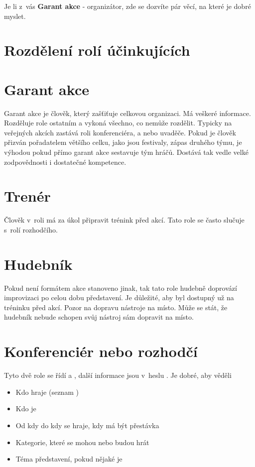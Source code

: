 \needspace{5cm} \label{příprava zápasu} Je li z~vás \textbf{Garant akce} - organizátor, zde se dozvíte pár věcí, na které je dobré myslet. 
\section{Rozdělení rolí účinkujících} \section{Garant akce} Garant akce je člověk, který zašťiťuje celkovou organizaci. Má veškeré informace. Rozděluje role ostatním a vykoná všechno, co nemůže rozdělit. Typicky na veřejných akcích zastává roli konferenciéra, a nebo uvaděče. Pokud je člověk přizván pořadatelem většího celku, jako jsou festivaly, zápas druhého týmu, je výhodou pokud přímo garant akce sestavuje tým hráčů. Dostává tak vedle velké zodpovědnosti i dostatečné kompetence. 
 
\section{Trenér} Člověk v~roli  má za úkol připravit trénink před akcí. Tato role se často slučuje s~rolí rozhodčího. 
\section{Hudebník} Pokud není formátem akce stanoveno jinak, tak tato role hudebně doprovází improvizaci po celou dobu představení. 
Je důležité, aby byl  dostupný už na tréninku před akcí. 
Pozor na dopravu nástroje na místo. Může se stát, že hudebník nebude schopen svůj nástroj sám dopravit na místo. 
 
\section{Konferenciér nebo rozhodčí} Tyto dvě role se řídí  a , další informace jsou v~heslu . 
Je dobré, aby věděli 
\begin{itemize}
\item Kdo hraje (seznam )
\item Kdo je 
\item Od kdy do kdy se hraje, kdy má být přestávka
\item Kategorie, které se mohou nebo budou hrát
\item Téma představení, pokud nějaké je
\end{itemize}
 
